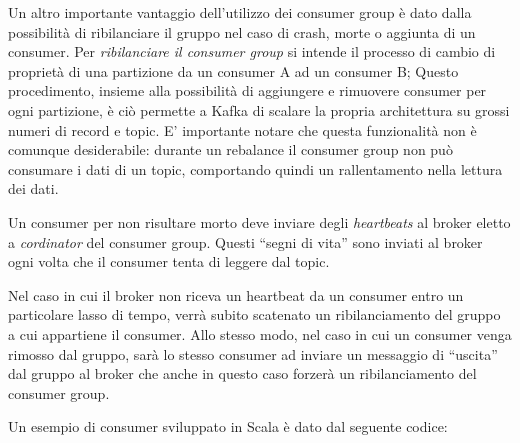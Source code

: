 \documentclass[]{article}
\begin{document}
Un altro importante vantaggio dell'utilizzo dei consumer group è dato
dalla possibilità di ribilanciare il gruppo nel caso di crash, morte o
aggiunta di un consumer. Per \emph{ribilanciare il consumer group} si
intende il processo di cambio di proprietà di una partizione da un
consumer A ad un consumer B; Questo procedimento, insieme alla
possibilità di aggiungere e rimuovere consumer per ogni partizione, è
ciò permette a Kafka di scalare la propria architettura su grossi numeri
di record e topic. E' importante notare che questa funzionalità non è
comunque desiderabile: durante un rebalance il consumer group non può
consumare i dati di un topic, comportando quindi un rallentamento nella
lettura dei dati.

Un consumer per non risultare morto deve inviare degli \emph{heartbeats}
al broker eletto a \emph{cordinator} del consumer group. Questi ``segni
di vita'' sono inviati al broker ogni volta che il consumer tenta di
leggere dal topic.

Nel caso in cui il broker non riceva un heartbeat da un consumer entro
un particolare lasso di tempo, verrà subito scatenato un ribilanciamento
del gruppo a cui appartiene il consumer. Allo stesso modo, nel caso in
cui un consumer venga rimosso dal gruppo, sarà lo stesso consumer ad
inviare un messaggio di ``uscita'' dal gruppo al broker che anche in
questo caso forzerà un ribilanciamento del consumer group.

Un esempio di consumer sviluppato in Scala è dato dal seguente codice:
\end{document}
